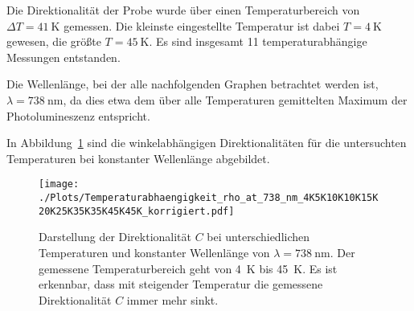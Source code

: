 Die Direktionalität der Probe wurde über einen Temperaturbereich von $ \Delta T =\SI{41}{\kelvin} $ gemessen.
Die kleinste eingestellte Temperatur ist dabei $T =\SI{4}{\kelvin}$ gewesen, die größte 
$T =\SI{45}{\kelvin}$.
Es sind insgesamt 11 temperaturabhängige Messungen entstanden.

Die Wellenlänge, bei der alle nachfolgenden Graphen betrachtet werden ist, \\$\lambda =\SI{738}{\nano\meter}$,
da dies etwa dem über alle Temperaturen gemittelten Maximum der Photolumineszenz entspricht.

In Abbildung~\ref{fig:temp_all_nach} sind die winkelabhängigen Direktionalitäten für die untersuchten Temperaturen
bei konstanter Wellenlänge abgebildet.
\newpage %
\begin{figure}
    \centering
    \texttt{[image: ./Plots/Temperaturabhaengigkeit\_rho\_at\_738\_nm\_4K5K10K10K15K20K25K35K35K45K45K\_korrigiert.pdf]}
    \caption{Darstellung der Direktionalität $C$ bei unterschiedlichen Temperaturen und konstanter Wellenlänge 
    von $\lambda =\SI{738}{\nano\meter}$. 
    Der gemessene Temperaturbereich geht von \SI{4}{\kelvin} bis \SI{45}{\kelvin}.
    Es ist erkennbar, dass mit steigender Temperatur die gemessene Direktionalität $C$ immer mehr sinkt.}
    \label{fig:temp_all_nach}
\end{figure}
\FloatBarrier

